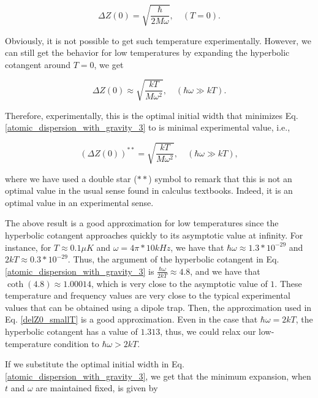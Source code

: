 \documentclass{article}
\begin{document}
\begin{equation}
    \Delta Z(0) = \sqrt{\frac{\hbar}{2M \omega} } , \quad (T=0).
\end{equation}

Obviously, it is not possible to get such temperature experimentally. However, we can still get the behavior for low temperatures by expanding the hyperbolic cotangent around $T=0$, we get

\begin{equation}\label{delZ0_smallT}
    \Delta Z (0) \approx \sqrt{\frac{ kT}{ M \omega^{2}}  }, \quad (\hbar \omega \gg kT).
\end{equation}

Therefore, experimentally, this is the optimal initial width that minimizes Eq. \ref{atomic_dispersion_with_gravity_3} to is minimal experimental value, i.e.,

\begin{equation}\label{eq_optimal_initial_width}
    (\Delta Z (0))^{**} = \sqrt{\frac{ kT}{ M \omega^{2}} }, \quad (\hbar \omega \gg kT),
\end{equation}

where we have used a double star ($**$) symbol to remark that this is not an optimal value in the usual sense found in calculus textbooks. Indeed, it is an optimal value in an experimental sense. 

The above result is a good approximation for low temperatures since the hyperbolic cotangent approaches quickly to its asymptotic value at infinity. For instance, for $T\approx 0.1 \mu K$ and $\omega = 4\pi *10 kHz$, we have that $\hbar \omega \approx 1.3*10^{-29}$ and $2 kT \approx 0.3*10^{-29}$. Thus, the argument of the hyperbolic cotangent in Eq. \ref{atomic_dispersion_with_gravity_3} is $\frac{\hbar \omega}{2kT} \approx 4.8$, and we have that $\coth (4.8) \approx 1.00014$, which is very close to the asymptotic value of $1$. These temperature and frequency values are very close to the typical experimental values that can be obtained using a dipole trap. Then, the approximation used in Eq. \ref{delZ0_smallT} is a good approximation. Even in the case that $\hbar \omega= 2kT$, the hyperbolic cotangent has a value of $1.313$, thus, we could relax our low-temperature condition to $\hbar \omega > 2kT$.

If we substitute the optimal initial width in Eq. \ref{atomic_dispersion_with_gravity_3}, we get that the minimum expansion, when $t$ and $\omega$ are maintained fixed, is given by
\end{document}

